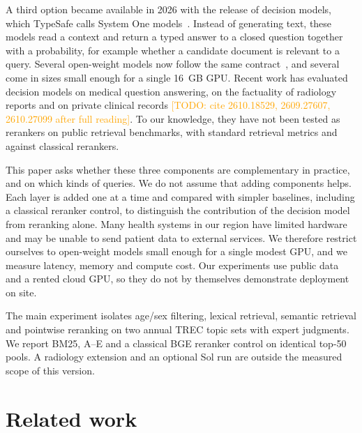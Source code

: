\documentclass{article}
\newcommand{\todo}[1]{\textcolor{orange}{[TODO: #1]}}
\begin{document}
A third option became available in 2026 with the release of decision models, which TypeSafe calls System One models~\citep{typesafe2026}. Instead of generating text, these models read a context and return a typed answer to a closed question together with a probability, for example whether a candidate document is relevant to a query. Several open-weight models now follow the same contract~\citep{systemonealternatives}, and several come in sizes small enough for a single 16~GB GPU. Recent work has evaluated decision models on medical question answering, on the factuality of radiology reports and on private clinical records \todo{cite 2610.18529, 2609.27607, 2610.27099 after full reading}. To our knowledge, they have not been tested as rerankers on public retrieval benchmarks, with standard retrieval metrics and against classical rerankers.

This paper asks whether these three components are complementary in practice, and on which kinds of queries. We do not assume that adding components helps. Each layer is added one at a time and compared with simpler baselines, including a classical reranker control, to distinguish the contribution of the decision model from reranking alone. Many health systems in our region have limited hardware and may be unable to send patient data to external services. We therefore restrict ourselves to open-weight models small enough for a single modest GPU, and we measure latency, memory and compute cost. Our experiments use public data and a rented cloud GPU, so they do not by themselves demonstrate deployment on site.

The main experiment isolates age/sex filtering, lexical retrieval, semantic retrieval and pointwise reranking on two annual TREC topic sets with expert judgments. We report BM25, A--E and a classical BGE reranker control on identical top-50 pools. A radiology extension and an optional Sol run are outside the measured scope of this version.

\section{Related work}
\label{sec:related}
\end{document}
